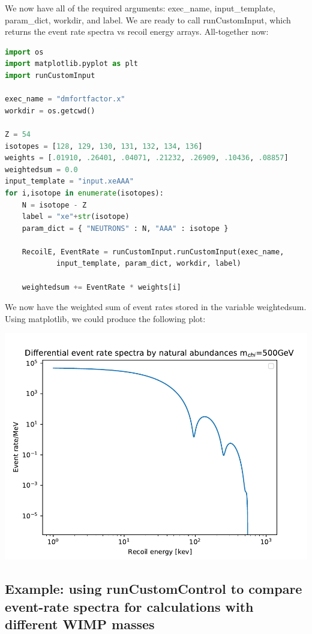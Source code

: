 \documentclass[11pt]{article}
\begin{document}
We now have all of the required arguments: exec\_name, input\_template,
param\_dict, workdir, and label. We are ready to call runCustomInput, which
returns the event rate spectra vs recoil energy arrays. All-together now:
\begin{lstlisting}[language=python]
import os
import matplotlib.pyplot as plt
import runCustomInput

exec_name = "dmfortfactor.x"
workdir = os.getcwd()

Z = 54
isotopes = [128, 129, 130, 131, 132, 134, 136]
weights = [.01910, .26401, .04071, .21232, .26909, .10436, .08857]
weightedsum = 0.0
input_template = "input.xeAAA"
for i,isotope in enumerate(isotopes):
    N = isotope - Z
    label = "xe"+str(isotope)
    param_dict = { "NEUTRONS" : N, "AAA" : isotope }

    RecoilE, EventRate = runCustomInput.runCustomInput(exec_name,
            input_template, param_dict, workdir, label)

    weightedsum += EventRate * weights[i]    
\end{lstlisting}
We now have the weighted sum of event rates stored in the variable weightedsum.
Using matplotlib, we could produce the following plot:

{
	\centering
\includegraphics[width=\textwidth]{weightedspectra.pdf}

}

\subsection{Example: using runCustomControl to compare event-rate spectra for
calculations with different WIMP masses}
\end{document}
